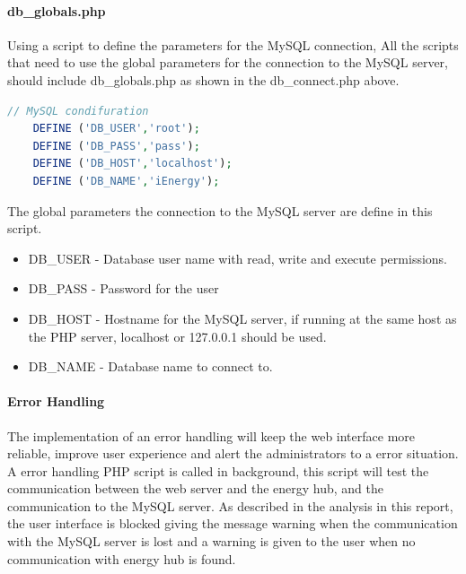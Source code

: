 \paragraph{db\_globals.php}

Using a script to define the parameters for the MySQL connection, 
All the scripts that need to use the global parameters for the connection to the MySQL server, should include db\_globals.php as shown in the db\_connect.php above.

\begin{lstlisting}[language=php]
	// MySQL condifuration
	DEFINE ('DB_USER','root');
	DEFINE ('DB_PASS','pass');
	DEFINE ('DB_HOST','localhost');
	DEFINE ('DB_NAME','iEnergy');
\end{lstlisting}

The global parameters the connection to the MySQL server are define in this script.

\begin{itemize}
	\item DB\_USER - Database user name with read, write and execute permissions.
	\item DB\_PASS - Password for the user
	\item DB\_HOST - Hostname for the MySQL server, if running at the same host as the PHP server, localhost or 127.0.0.1 should be used.
	\item DB\_NAME - Database name to connect to.
\end{itemize}

\paragraph{Error Handling}
The implementation of an error handling will keep the web interface more reliable, improve user experience and alert the administrators to a error situation. A error handling PHP script is called in background, this script will test the communication between the web server and the energy hub, and the communication to the MySQL server. As described in the analysis in this report, the user interface is blocked giving the message warning when the communication with the MySQL server is lost and a warning is given to the user when no communication with energy hub is found.

